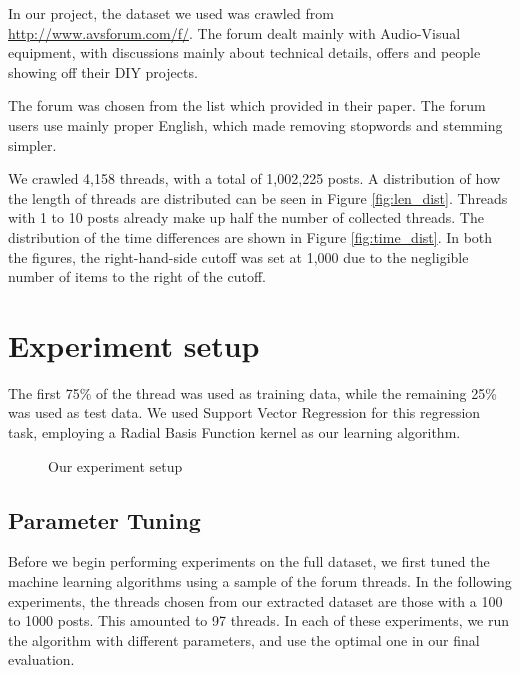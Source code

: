 In our project, the dataset we used was crawled from 
\url{http://www.avsforum.com/f/}. The forum dealt mainly with Audio-Visual 
equipment, with discussions mainly about technical details, offers and people 
showing off their DIY projects.

The forum was chosen from the list which  provided in their 
paper. The forum users use mainly proper English, which made removing stopwords 
and stemming simpler.

We crawled 4,158 threads, with a total of 1,002,225 posts. A distribution of how 
the length of threads are distributed can be seen in Figure \ref{fig:len_dist}.  
Threads with 1 to 10 posts already make up half the number of collected threads.
The distribution of the time differences are shown in Figure 
\ref{fig:time_dist}. In both the figures, the right-hand-side cutoff was set at 
1,000 due to the negligible number of items to the right of the cutoff.



\section{Experiment setup}
The first 75\% of the thread was used as training data, while the remaining 25\% 
was used as test data. We used Support Vector Regression for this regression 
task, employing a Radial Basis Function kernel as our learning algorithm. 

\begin{figure}
	
	\caption{Our experiment setup}\label{fig:exp_setup}
\end{figure}

\subsection{Parameter Tuning}
Before we begin performing experiments on the full dataset, we first tuned the 
machine learning algorithms using a sample of the forum threads. In the 
following experiments, the threads chosen from our extracted dataset are those 
with a 100 to 1000 posts. This amounted to 97 threads.
In each of these experiments, we run the algorithm with different parameters, 
and use the optimal one in our final evaluation. 

